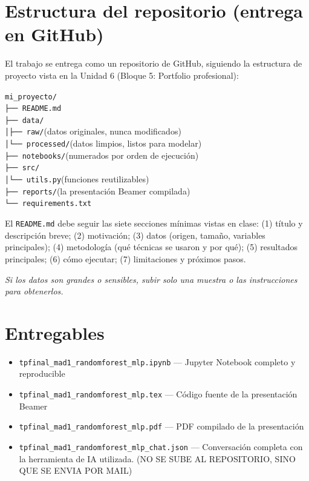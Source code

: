 \documentclass[11pt,a4paper]{article}
\newcommand{\codigo}[1]{\texttt{#1}}
\begin{document}
\section{Estructura del repositorio (entrega en GitHub)}
El trabajo se entrega como un repositorio de GitHub, siguiendo la estructura de proyecto vista en la Unidad 6 (Bloque 5: Portfolio profesional):
\begin{center}
\begin{minipage}{0.82\textwidth}
\codigo{mi\_proyecto/}\\
\codigo{\phantom{x}├── README.md}\\
\codigo{\phantom{x}├── data/}\\
\codigo{\phantom{x}│\phantom{xx}├── raw/}\hfill (datos originales, nunca modificados)\\
\codigo{\phantom{x}│\phantom{xx}└── processed/}\hfill (datos limpios, listos para modelar)\\
\codigo{\phantom{x}├── notebooks/}\hfill (numerados por orden de ejecuci\'on)\\
\codigo{\phantom{x}├── src/}\\
\codigo{\phantom{x}│\phantom{xx}└── utils.py}\hfill (funciones reutilizables)\\
\codigo{\phantom{x}├── reports/}\hfill (la presentaci\'on Beamer compilada)\\
\codigo{\phantom{x}└── requirements.txt}
\end{minipage}
\end{center}

El \codigo{README.md} debe seguir las siete secciones m\'inimas vistas en clase: (1) t\'itulo y descripci\'on breve; (2) motivaci\'on; (3) datos (origen, tama\~no, variables principales); (4) metodolog\'ia (qu\'e t\'ecnicas se usaron y por qu\'e); (5) resultados principales; (6) c\'omo ejecutar; (7) limitaciones y pr\'oximos pasos.

\textit{Si los datos son grandes o sensibles, subir solo una muestra o las instrucciones para obtenerlos.}

\section{Entregables}
\begin{itemize}[leftmargin=2em,itemsep=2pt]
    \item \codigo{tpfinal\_mad1\_randomforest\_mlp.ipynb} --- Jupyter Notebook completo y reproducible
    \item \codigo{tpfinal\_mad1\_randomforest\_mlp.tex} --- C\'odigo fuente de la presentaci\'on Beamer
    \item \codigo{tpfinal\_mad1\_randomforest\_mlp.pdf} --- PDF compilado de la presentaci\'on
    \item \codigo{tpfinal\_mad1\_randomforest\_mlp\_chat.json} --- Conversaci\'on completa con la herramienta de IA utilizada. (NO SE SUBE AL REPOSITORIO, SINO QUE SE ENVIA POR MAIL)
\end{itemize}
\end{document}
